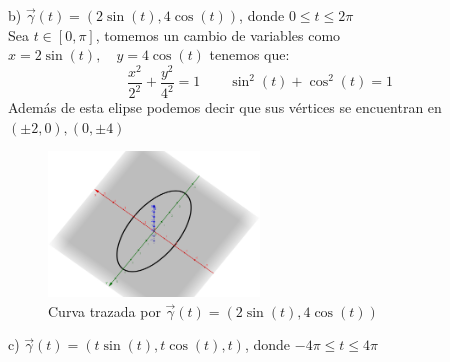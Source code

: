 \documentclass[letterpaper]{article}
\renewcommand{\*}{\cdot}
\theoremstyle{definition}
\begin{document}
\noindent b) $\vec{\gamma}(t) = (2\sin(t), 4\cos(t))$, donde $0 \leq t \leq 2\pi$\\
Sea $ t \in [0,\pi] $, tomemos un cambio de variables como $ x = 2\sin(t), \quad y= 4\cos(t) $ tenemos que:
\[ \dfrac{x^2}{2^2} + \dfrac{y^2}{4^2} = 1 \quad\quad \sin^2(t) + \cos^2(t) = 1  \]
Además de esta elipse podemos decir que sus vértices se encuentran en $ (\pm 2,0), (0,\pm 4) $

\begin{figure}[h!]
	\centering
		\includegraphics[width=0.5\textwidth]{img/Proyecto4_6.png}
		\caption{Curva trazada por $ \vec{\gamma}(t)= (2\sin(t), 4\cos(t)) $}
\end{figure}

\newpage
\noindent c) $\vec{\gamma}(t) = (t\sin(t), t\cos(t), t)$, donde $ -4\pi \leq t \leq 4\pi$\\
\end{document}
